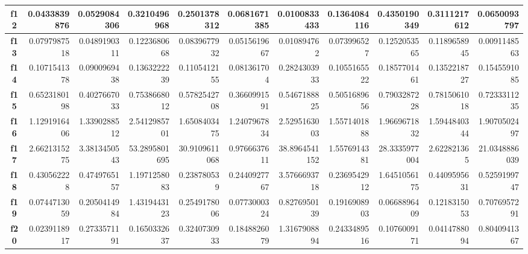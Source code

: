 \documentclass[a4paper,11pt]{article}
\begin{document}
\begin{table}[H]
\begin{adjustbox}{width=1.15\textwidth}
\begin{tabular}{|c|r|r|r|r|r|r|r|r|r|r|}
  \textbf{f12} & 0.0433839876 & 0.0529084306 & 0.3210496968 & 0.2501378312 & 0.0681671385 & 0.0100833433 & 0.1364084116 & 0.4350190349 & 0.3111217612 & 0.0650093797 \\ \hline
  \textbf{f13} & 0.0797987518 & 0.0489190311 & 0.1223680668 & 0.0839677932 & 0.0515619667 & 0.010894762 & 0.073996527 & 0.1252053565 & 0.1189658945 & 0.0091148563 \\ \hline
  \textbf{f14} & 0.1071541378 & 0.0900969438 & 0.1363222239 & 0.1105412155 & 0.081361704 & 0.2824303933 & 0.1055165522 & 0.1857701461 & 0.1352218727 & 0.1545591085 \\ \hline
  \textbf{f15} & 0.6523180198 & 0.4027667033 & 0.7538668012 & 0.5782542708 & 0.3660991591 & 0.5467188825 & 0.5051689656 & 0.7903287228 & 0.7815061018 & 0.7233311235 \\ \hline
  \textbf{f16} & 1.1291916406 & 1.3390288512 & 2.5412985701 & 1.6508403475 & 1.2407967834 & 2.5295163003 & 1.5571401888 & 1.9669671832 & 1.5944840344 & 1.9070502497 \\ \hline
  \textbf{f17} & 2.6621315275 & 3.3813450543 & 53.2895801695 & 30.9109611068 & 0.9766637611 & 38.8964541152 & 1.5576914381 & 28.3335977004 & 2.622821365 & 21.0348886039 \\ \hline
  \textbf{f18} & 0.430562228 & 0.4749765157 & 1.1971258083 & 0.238780539 & 0.2440927767 & 3.5766693718 & 0.2369542912 & 1.6451056175 & 0.4409595631 & 0.5259199747 \\ \hline
  \textbf{f19} & 0.0744713059 & 0.2050414984 & 1.4319443123 & 0.2549178006 & 0.0773000324 & 0.8276950139 & 0.1916908903 & 0.0668896409 & 0.1218315053 & 0.7076957291 \\ \hline
  \textbf{f20} & 0.0239118917 & 0.2733571191 & 0.1650332637 & 0.3240730933 & 0.1848826079 & 1.3167908894 & 0.2433489516 & 0.1076009171 & 0.0414788094 & 0.8040941367 \\ \hline
  \end{tabular}
  \end{adjustbox}
  \label{allresults}
  \end{table}
  
\end{document}
